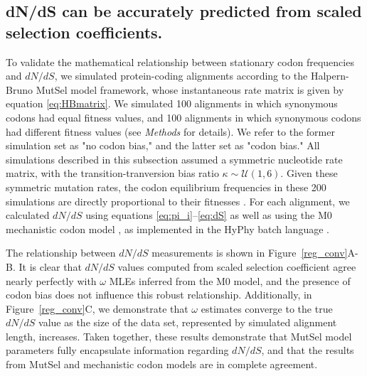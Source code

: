 \documentclass{pnastwo}
\begin{document}
\begin{article}
\subsection*{dN/dS can be accurately predicted from scaled selection coefficients.}

To validate the mathematical relationship between stationary codon frequencies and $dN/dS$, we simulated protein-coding alignments according to the Halpern-Bruno \cite{HalpernBruno1998} MutSel model framework, whose instantaneous rate matrix is given by equation \eqref{eq:HBmatrix}. We simulated 100 alignments in which synonymous codons had equal fitness values, and 100 alignments in which synonymous codons had different fitness values (see \textit{Methods} for details). We refer to the former simulation set as "no codon bias," and the latter set as "codon bias." All simulations described in this subsection assumed  a symmetric nucleotide rate matrix, with the transition-tranversion bias ratio $\kappa \sim \mathcal{U}(1,6)$. Given these symmetric mutation rates, the codon equilibrium frequencies in these 200 simulations are directly proportional to their fitnesses \cite{SellaHirsh2005}. For each alignment, we calculated $dN/dS$ using equations \eqref{eq:pi_i}--\eqref{eq:dS} as well as using the M0 mechanistic codon model \cite{NielsenYang1998}, as implemented in the HyPhy batch language \cite{KosakovskyPondetal2005}.

The relationship between $dN/dS$ measurements is shown in Figure~\ref{reg_conv}A-B. It is clear that $dN/dS$ values computed from scaled selection coefficient agree nearly perfectly with $\omega$ MLEs inferred from the M0 model, and the presence of codon bias does not influence this robust relationship. Additionally, in Figure~\ref{reg_conv}C, we demonstrate that $\omega$ estimates converge to the true $dN/dS$ value as the size of the data set, represented by simulated alignment length, increases. Taken together, these results demonstrate that MutSel model parameters fully encapsulate information regarding $dN/dS$, and that the results from MutSel and mechanistic codon models are in complete agreement.


\end{article}
\end{document}
